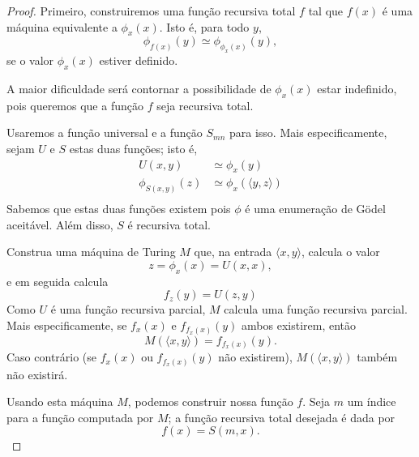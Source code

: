 \begin{proof}
    Primeiro,
    construiremos uma função recursiva total $f$
    tal que $f(x)$ é uma máquina equivalente a $\phi_x(x)$.
    Isto é,
    para todo $y$,
    \begin{equation}
        \phi_{f(x)}(y) \simeq \phi_{\phi_x(x)}(y),
        \label{eq:diagonal_M}
    \end{equation}
    se o valor $\phi_x(x)$ estiver definido.

    A maior dificuldade será contornar a possibilidade de $\phi_x(x)$ estar indefinido,
    pois queremos que a função $f$ seja recursiva total.

    Usaremos a função universal e a função $S_{mn}$ para isso.
    Mais especificamente,
    sejam $U$ e $S$ estas duas funções;
    isto é,
    \begin{align*}
        U(x, y) &\simeq \phi_x(y) \\
        \phi_{S(x, y)}(z) &\simeq \phi_x(\langle y, z \rangle) \\
    \end{align*}
    Sabemos que estas duas funções existem
    pois $\phi$ é uma enumeração de Gödel aceitável.
    Além disso, $S$ é recursiva total.

    Construa uma máquina de Turing $M$ que,
    na entrada $\langle x, y \rangle$,
    calcula o valor
    \begin{equation}
        z = \phi_x(x) = U(x, x),
        \label{eq:f_x_x}
    \end{equation}
    e em seguida calcula
    \begin{equation}
        f_z(y) = U(z, y)
        \label{eq:f_f_x_x_y}
    \end{equation}
    Como $U$ é uma função recursiva parcial,
    $M$ calcula uma função recursiva parcial.
    Mais especificamente,
    se $f_x(x)$ e $f_{f_x(x)}(y)$ ambos existirem,
    então
    \begin{equation*}
        M(\langle x, y \rangle) = f_{f_x(x)}(y).
    \end{equation*}
    Caso contrário (se $f_x(x)$ ou $f_{f_x(x)}(y)$ não existirem),
    $M(\langle x, y \rangle)$ também não existirá.

    Usando esta máquina $M$,
    podemos construir nossa função $f$.
    Seja $m$ um índice\footnotemark{} para a função computada por $M$;
    a função recursiva total desejada é dada por
    \begin{equation*}
        f(x) = S(m, x).
    \end{equation*}
\end{proof}
